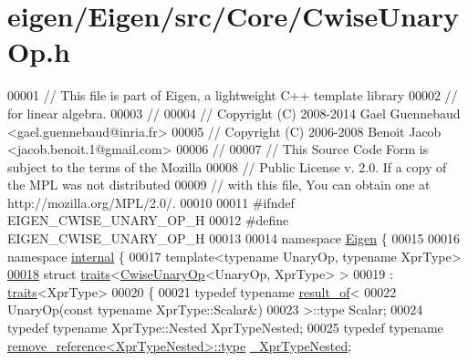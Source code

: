\hypertarget{eigen_2_eigen_2src_2_core_2_cwise_unary_op_8h_source}{}\section{eigen/\+Eigen/src/\+Core/\+Cwise\+Unary\+Op.h}
\label{eigen_2_eigen_2src_2_core_2_cwise_unary_op_8h_source}

\begin{DoxyCode}
00001 \textcolor{comment}{// This file is part of Eigen, a lightweight C++ template library}
00002 \textcolor{comment}{// for linear algebra.}
00003 \textcolor{comment}{//}
00004 \textcolor{comment}{// Copyright (C) 2008-2014 Gael Guennebaud <gael.guennebaud@inria.fr>}
00005 \textcolor{comment}{// Copyright (C) 2006-2008 Benoit Jacob <jacob.benoit.1@gmail.com>}
00006 \textcolor{comment}{//}
00007 \textcolor{comment}{// This Source Code Form is subject to the terms of the Mozilla}
00008 \textcolor{comment}{// Public License v. 2.0. If a copy of the MPL was not distributed}
00009 \textcolor{comment}{// with this file, You can obtain one at http://mozilla.org/MPL/2.0/.}
00010 
00011 \textcolor{preprocessor}{#ifndef EIGEN\_CWISE\_UNARY\_OP\_H}
00012 \textcolor{preprocessor}{#define EIGEN\_CWISE\_UNARY\_OP\_H}
00013 
00014 \textcolor{keyword}{namespace }\hyperlink{namespace_eigen}{Eigen} \{ 
00015 
00016 \textcolor{keyword}{namespace }\hyperlink{namespaceinternal}{internal} \{
00017 \textcolor{keyword}{template}<\textcolor{keyword}{typename} UnaryOp, \textcolor{keyword}{typename} XprType>
\hyperlink{struct_eigen_1_1internal_1_1traits_3_01_cwise_unary_op_3_01_unary_op_00_01_xpr_type_01_4_01_4}{00018} \textcolor{keyword}{struct }\hyperlink{struct_eigen_1_1internal_1_1traits}{traits}<\hyperlink{group___core___module_class_eigen_1_1_cwise_unary_op}{CwiseUnaryOp}<UnaryOp, XprType> >
00019  : \hyperlink{struct_eigen_1_1internal_1_1traits}{traits}<XprType>
00020 \{
00021   \textcolor{keyword}{typedef} \textcolor{keyword}{typename} \hyperlink{struct_eigen_1_1internal_1_1result__of}{result\_of}<
00022                      UnaryOp(\textcolor{keyword}{const} \textcolor{keyword}{typename} XprType::Scalar&)
00023                    >::type Scalar;
00024   \textcolor{keyword}{typedef} \textcolor{keyword}{typename} XprType::Nested XprTypeNested;
00025   \textcolor{keyword}{typedef} \textcolor{keyword}{typename} \hyperlink{group___sparse_core___module}{remove\_reference<XprTypeNested>::type} 
      \hyperlink{group___sparse_core___module}{\_XprTypeNested};

\end{DoxyCode}
